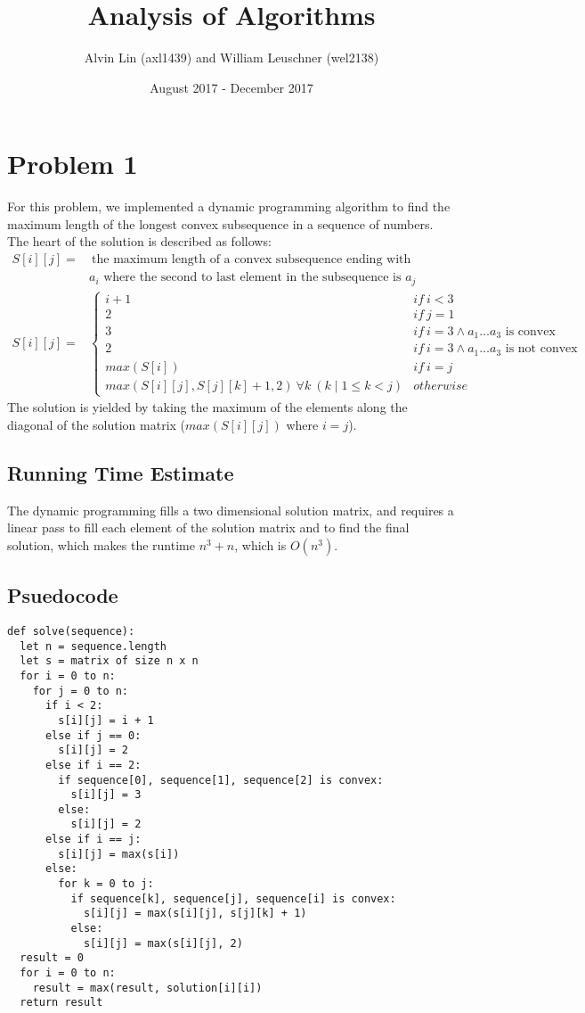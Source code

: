 \documentclass{math}
\title{Analysis of Algorithms}
\author{Alvin Lin (axl1439) and William Leuschner (wel2138)}
\date{August 2017 - December 2017}
\begin{document}
\maketitle

\section*{Problem 1}
For this problem, we implemented a dynamic programming algorithm to find the
maximum length of the longest convex subsequence in a sequence of numbers. The
heart of the solution is described as follows:
\begin{align*}
  S[i][j] =& ~\text{the maximum length of a convex subsequence ending with} \\
  & a_i \text{ where the second to last element in the subsequence is } a_j \\
  S[i][j] =& \begin{cases}
    i + 1 & if~ i < 3 \\
    2 & if~ j = 1 \\
    3 & if~ i = 3 \wedge a_1\dots a_3 \text{ is convex} \\
    2 & if~ i = 3 \wedge a_1\dots a_3 \text{ is not convex} \\
    max(S[i]) & if~ i = j \\
    max(S[i][j], S[j][k] + 1, 2)~\forall k~(k\mid 1\le k<j) & otherwise
  \end{cases}
\end{align*}
The solution is yielded by taking the maximum of the elements along the diagonal
of the solution matrix (\( max(S[i][j]) \) where \( i = j \)).

\subsection*{Running Time Estimate}
The dynamic programming fills a two dimensional solution matrix, and requires
a linear pass to fill each element of the solution matrix and to find the final
solution, which makes the runtime \( n^3+n \), which is \( O(n^3) \).

\subsection*{Psuedocode}
\begin{lstlisting}
def solve(sequence):
  let n = sequence.length
  let s = matrix of size n x n
  for i = 0 to n:
    for j = 0 to n:
      if i < 2:
        s[i][j] = i + 1
      else if j == 0:
        s[i][j] = 2
      else if i == 2:
        if sequence[0], sequence[1], sequence[2] is convex:
          s[i][j] = 3
        else:
          s[i][j] = 2
      else if i == j:
        s[i][j] = max(s[i])
      else:
        for k = 0 to j:
          if sequence[k], sequence[j], sequence[i] is convex:
            s[i][j] = max(s[i][j], s[j][k] + 1)
          else:
            s[i][j] = max(s[i][j], 2)
  result = 0
  for i = 0 to n:
    result = max(result, solution[i][i])
  return result
\end{lstlisting}
\end{document}
